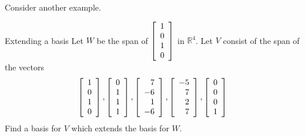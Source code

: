 Consider another example.

\begin{example}{Extending a basis}{}
Let $W$ be the span of $\left[
\begin{array}{c}
1 \\ 
0 \\ 
1 \\ 
0
\end{array}
\right] $ in $\mathbb{R}^{4}$. Let $V$ consist of the span of the vectors 
\begin{equation*}
\left[
\begin{array}{c}
1 \\ 
0 \\ 
1 \\ 
0
\end{array}
\right] ,\left[ 
\begin{array}{c}
0 \\ 
1 \\ 
1 \\ 
1
\end{array}
\right] ,\left[ 
\begin{array}{r}
7 \\ 
-6 \\ 
1 \\ 
-6
\end{array}
\right] ,\left[ 
\begin{array}{r}
-5 \\ 
7 \\ 
2 \\ 
7
\end{array}
\right] ,\left[ 
\begin{array}{c}
0 \\ 
0 \\ 
0 \\ 
1
\end{array}
\right]
\end{equation*}
Find a basis for $V$ which extends the basis for $W$.
\end{example}

